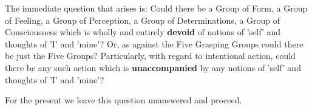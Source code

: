 The immediate question that arises is: Could there be a Group of Form, a Group of Feeling, a Group of Perception, a Group of Determinations, a Group of Consciousness which is wholly and entirely \textbf{devoid} of notions of 'self' and thoughts of 'I' and 'mine'? Or, as against the Five Grasping Groups could there be just the Five Groups? Particularly, with regard to intentional action, could there be any such action which is \textbf{unaccompanied} by any notions of 'self' and thoughts of 'I' and 'mine'?

For the present we leave this question unanswered and proceed.
